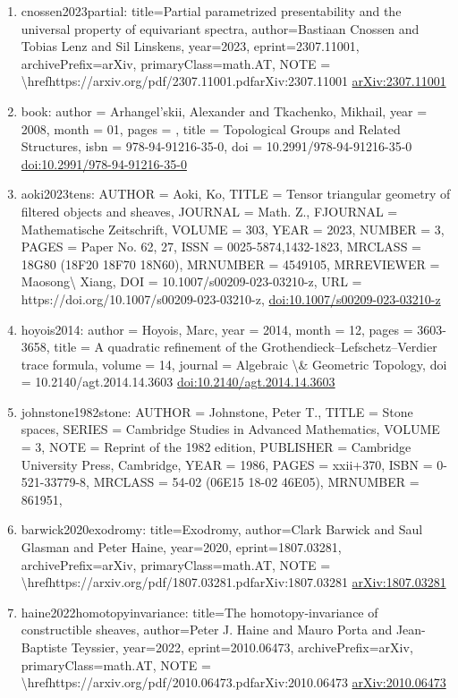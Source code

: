\documentclass[11pt]{article}
\begin{document}
\begin{enumerate}[leftmargin=*]
  \item cnossen2023partial: title=Partial parametrized presentability and the universal property of equivariant spectra, author=Bastiaan Cnossen and Tobias Lenz and Sil Linskens, year=2023, eprint=2307.11001, archivePrefix=arXiv, primaryClass=math.AT, NOTE = \textbackslash{}hrefhttps://arxiv.org/pdf/2307.11001.pdfarXiv:2307.11001 \href{https://arxiv.org/abs/2307.11001}{arXiv:2307.11001}
  \item book: author = Arhangel'skii, Alexander and Tkachenko, Mikhail, year = 2008, month = 01, pages = , title = Topological Groups and Related Structures, isbn = 978-94-91216-35-0, doi = 10.2991/978-94-91216-35-0 \href{https://doi.org/10.2991/978-94-91216-35-0}{doi:10.2991/978-94-91216-35-0}
  \item aoki2023tens: AUTHOR = Aoki, Ko, TITLE = Tensor triangular geometry of filtered objects and sheaves, JOURNAL = Math. Z., FJOURNAL = Mathematische Zeitschrift, VOLUME = 303, YEAR = 2023, NUMBER = 3, PAGES = Paper No. 62, 27, ISSN = 0025-5874,1432-1823, MRCLASS = 18G80 (18F20 18F70 18N60), MRNUMBER = 4549105, MRREVIEWER = Maosong\textbackslash{} Xiang, DOI = 10.1007/s00209-023-03210-z, URL = https://doi.org/10.1007/s00209-023-03210-z, \href{https://doi.org/10.1007/s00209-023-03210-z}{doi:10.1007/s00209-023-03210-z}
  \item hoyois2014: author = Hoyois, Marc, year = 2014, month = 12, pages = 3603-3658, title = A quadratic refinement of the Grothendieck--Lefschetz--Verdier trace formula, volume = 14, journal = Algebraic \textbackslash{}\& Geometric Topology, doi = 10.2140/agt.2014.14.3603 \href{https://doi.org/10.2140/agt.2014.14.3603}{doi:10.2140/agt.2014.14.3603}
  \item johnstone1982stone: AUTHOR = Johnstone, Peter T., TITLE = Stone spaces, SERIES = Cambridge Studies in Advanced Mathematics, VOLUME = 3, NOTE = Reprint of the 1982 edition, PUBLISHER = Cambridge University Press, Cambridge, YEAR = 1986, PAGES = xxii+370, ISBN = 0-521-33779-8, MRCLASS = 54-02 (06E15 18-02 46E05), MRNUMBER = 861951,
  \item barwick2020exodromy: title=Exodromy, author=Clark Barwick and Saul Glasman and Peter Haine, year=2020, eprint=1807.03281, archivePrefix=arXiv, primaryClass=math.AT, NOTE = \textbackslash{}hrefhttps://arxiv.org/pdf/1807.03281.pdfarXiv:1807.03281 \href{https://arxiv.org/abs/1807.03281}{arXiv:1807.03281}
  \item haine2022homotopyinvariance: title=The homotopy-invariance of constructible sheaves, author=Peter J. Haine and Mauro Porta and Jean-Baptiste Teyssier, year=2022, eprint=2010.06473, archivePrefix=arXiv, primaryClass=math.AT, NOTE = \textbackslash{}hrefhttps://arxiv.org/pdf/2010.06473.pdfarXiv:2010.06473 \href{https://arxiv.org/abs/2010.06473}{arXiv:2010.06473}

\end{enumerate}
\end{document}
